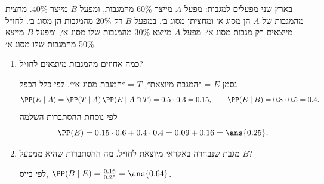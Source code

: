 בארץ שני מפעלים למגבות: מפעל $A$ מייצר 60\% מהמגבות, ומפעל $B$ מייצר 40\%. מחצית מהמגבות של $A$ הן מסוג א׳ ומחציתן מסוג ב׳. במפעל $B$ רק 20\% מהמגבות הן מסוג ב׳. לחו״ל מייצאים רק מגבות מסוג א׳: מפעל $A$ מייצא 30\% מהמגבות שלו מסוג א׳, ומפעל $B$ מייצא 50\% מהמגבות שלו מסוג א׳.
\begin{enumerate}
\item כמה אחוזים מהמגבות מיוצאים לחו״ל?
\begin{solbox}
נסמן $E$ = ״המגבת מיוצאת״, $T$ = ״המגבת מסוג א׳״. לפי כלל הכפל
\[
\PP(E\mid A)=\PP(T\mid A)\,\PP(E\mid A\cap T)=0.5\cdot0.3=0.15,\qquad
\PP(E\mid B)=0.8\cdot0.5=0.4.
\]
לפי נוסחת ההסתברות השלמה
\[
\PP(E)=0.15\cdot0.6+0.4\cdot0.4=0.09+0.16=\ans{0.25}.
\]
\end{solbox}
\item מגבת שנבחרה באקראי מיוצאת לחו״ל. מה ההסתברות שהיא ממפעל $B$?
\begin{solbox}
לפי בייס, $\PP(B\mid E)=\frac{0.16}{0.25}=\ans{0.64}$.
\end{solbox}
\end{enumerate}
